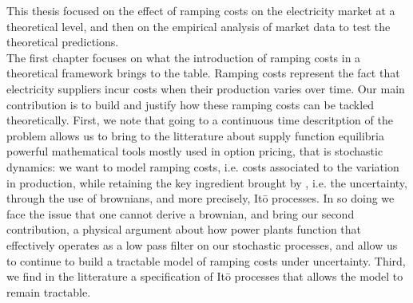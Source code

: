 \doublespacing

This thesis focused on the effect of ramping costs on the electricity market at a theoretical level, and then on the empirical analysis of market data to test the theoretical predictions.\\

The first chapter focuses on what the introduction of ramping costs in a theoretical framework brings to the table. Ramping costs represent the fact that electricity suppliers incur costs when their production varies over time. Our main contribution is to build and justify how these ramping costs can be tackled theoretically. First, we note that going to a continuous time descritption of the problem allows us to bring to the litterature about supply function equilibria powerful mathematical tools mostly used in option pricing, that is stochastic dynamics: we want to model ramping costs, i.e. costs associated to the variation in production, while retaining the key ingredient brought by \cite{KM}, i.e. the uncertainty, through the use of brownians, and more precisely, It\={o} processes. In so doing we face the issue that one cannot derive a brownian, and bring our second contribution, a physical argument about how power plants function that effectively operates as a low pass filter on our stochastic processes, and allow us to continue to build a tractable model of ramping costs under uncertainty. Third, we find in the litterature a specification of It\={o} processes that allows the model to remain tractable. \\

